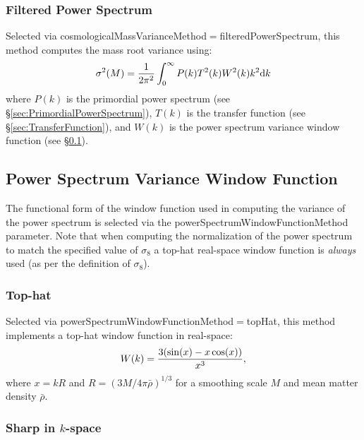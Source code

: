\subsubsection{Filtered Power Spectrum}

Selected via {\normalfont \ttfamily cosmologicalMassVarianceMethod}$=${\normalfont \ttfamily filteredPowerSpectrum}, this method computes the mass root variance using:
\begin{equation}
 \sigma^2(M) = {1 \over 2 \pi^2} \int_0^\infty P(k) T^2(k) W^2(k) k^2 {\mathrm d}k
\end{equation}
where $P(k)$ is the primordial power spectrum (see \S\ref{sec:PrimordialPowerSpectrum}), $T(k)$ is the transfer function (see \S\ref{sec:TransferFunction}), and $W(k)$ is the power spectrum variance window function (see \S\ref{sec:PowerSpectrumWindowFunctionPhysics}).

\subsection{Power Spectrum Variance Window Function}\label{sec:PowerSpectrumWindowFunctionPhysics}

The functional form of the window function used in computing the variance of the power spectrum is selected via the {\normalfont \ttfamily powerSpectrumWindowFunctionMethod} parameter. Note that when computing the normalization of the power spectrum to match the specified value of $\sigma_8$ a top-hat real-space window function is \emph{always} used (as per the definition of $\sigma_8$).

\subsubsection{Top-hat}

Selected via {\normalfont \ttfamily powerSpectrumWindowFunctionMethod}$=${\normalfont \ttfamily topHat}, this method implements a top-hat window function in real-space:
\begin{equation}
 W(k) = {3 (\sin(x)-x \cos(x)) \over x^3},
\end{equation}
where $x = k R$ and $R=(3M/4\pi\bar{\rho})^{1/3}$ for a smoothing scale $M$ and mean matter density $\bar{\rho}$.

\subsubsection{Sharp in $k$-space}

